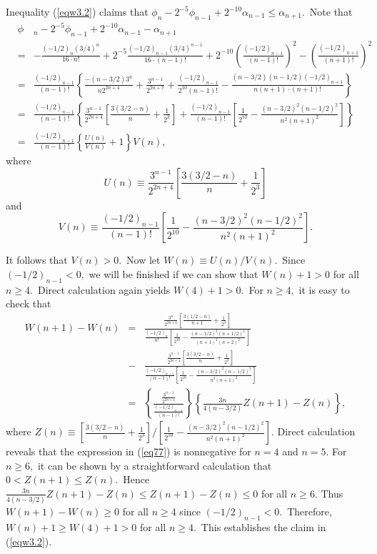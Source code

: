 \documentclass[final,oneeqnum]{siamltex}
\begin{document}
Inequality (\ref{eqw3.2}) claims that $\displaystyle
\phi_{n} - 2^{-5}\phi_{n-1} + 2^{-10}\alpha_{n-1} \leq \alpha_{n+1}$.\  Note
that
\begin{eqnarray*} 
&\phi&_{n} - 2^{-5}\phi_{n-1} +
2^{-10}\alpha_{n-1} - \alpha_{n+1}\nonumber\\
&=& -\frac{(-1/2)_{n}(3/4)^n}{16\cdot
n!}+2^{-5}\frac{(-1/2)_{n-1}(3/4)^{n-1}}{16\cdot (n-1)!}
 + 2^{-10}\left(\frac{(-1/2)_{n-1}}{(n-1)!}\right)^2 -
\left(\frac{(-1/2)_{n+1}}{(n+1)!}\right)^2  \\
&=& \frac{(-1/2)_{n-1}}{(n-1)!}\left\{
\frac{-(n-3/2)3^n}{n2^{2n+4}} + \frac{3^{n-1}}{2^{2n+7}}
+\frac{(-1/2)_{n-1}}{2^{10}(n-1)!}-
\frac{(n-3/2)(n-1/2)(-1/2)_{n+1}}{n(n+1)\cdot(n+1)!}\right\} \\
&=& \frac{(-1/2)_{n-1}}{(n-1)!}\left\{
\frac{3^{n-1}}{2^{2n+4}}\left[\frac{3(3/2-n)}{n}+ \frac{1}{2^3}\right] +
\frac{(-1/2)_{n-1}}{(n-1)!}\left[
\frac{1}{2^{10}}-\frac{(n-3/2)^2(n-1/2)^2}{n^2(n+1)^2}\right] \right\} \\
&=& \frac{(-1/2)_{n-1}}{(n-1)!}\left\{\frac{U(n)}{V(n)} +1\right\}V(n) ,
\end{eqnarray*} 
where  $$\displaystyle  U(n) \equiv
\frac{3^{n-1}}{2^{2n+4}}\left[\frac{3(3/2-n)}{n}+
\frac{1}{2^3}\right]$$  and 
$$
\displaystyle V(n) \equiv
\frac{(-1/2)_{n-1}}{(n-1)!}\left[\frac{1}{2^{10}}-\frac{(n-3/2)^2(n-1/2)^2}{
n^2(n+1)^2}\right].
$$

\noindent It follows that $V(n) > 0$.\ Now let $W(n) \equiv U(n)/V(n)$.\ Since
$(-1/2)_{n-1} < 0,$ we will be finished if we can
show that $W(n)+1 > 0$ for all $n\geq 4$.\ Direct calculation again yields
$W(4) +1>0$.\ For $n\geq4,$ it is easy to check that
\begin{eqnarray} 
W(n+1) -W(n)  &=&
\frac{
\frac{3^{n}}{2^{2n+6}}\left[\frac{3(1/2-n)}{n+1}+
\frac{1}{2^3}\right]}{
\frac{(-1/2)_{n}}{n!}\left[
\frac{1}{2^{10}}-\frac{(n-1/2)^2(n+1/2)^2}{(n+1)^2(n+2)^2}\right]} \nonumber \\
&-&\frac{
\frac{3^{n-1}}{2^{2n+4}}\left[\frac{3(3/2-n)}{n}+
\frac{1}{2^3}\right]}{
\frac{(-1/2)_{n-1}}{(n-1)!}\left[
\frac{1}{2^{10}}-\frac{(n-3/2)^2(n-1/2)^2}{n^2(n+1)^2}\right]
} \nonumber \\
 &=& \left\{\frac{\frac{3^{n-1}}{2^{2n+4}}}{\frac{(-1/2)_{n-1}}{(n-1)
!}}\right\}
\left\{\frac{3n}{4(n-3/2)}Z(n+1) - Z(n)
\right\}, \label{eq77}
\end{eqnarray} 
where $Z(n) \equiv
[\frac{3(3/2-n)}{n}+ \frac{1}{2^3}]/
        [\frac{1}{2^{10}}-\frac{(n-3/2)^2(n-1/2)^2}{n^2(n+1)^2}].$
 Direct calculation reveals that the expression in
(\ref{eq77}) is nonnegative for $n=4$ and $n=5$.
For $n\geq 6,$ it can be shown by a straightforward calculation that
$0<Z(n+1)\leq Z(n)$.\ Hence
$
\frac{3n}{4(n-3/2)}Z(n+1) - Z(n) \leq Z(n+1) - Z(n) \leq 0$ for all $n\geq 6$.
 Thus $W(n+1) - W(n) \geq 0$  for all $n\geq 4$ since
$(-1/2)_{n-1} < 0$.\ Therefore,
 $W(n) + 1 \geq W(4) + 1 >0$  for all $n\geq 4$.\ This establishes the claim in
(\ref{eqw3.2}).\, \qquad\endproof%
\end{document}
